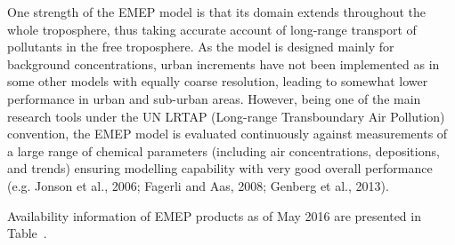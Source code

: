 \documentclass[9pt]{article}
\begin{document}
One strength of the EMEP model is that its domain extends throughout the whole troposphere, thus taking accurate account of long-range transport of pollutants in the free troposphere. 
As the model is designed mainly for background concentrations, urban increments have not been implemented as in some other models with equally coarse resolution, leading to somewhat lower performance in urban and sub-urban areas. 
However, being one of the main research tools under the UN LRTAP (Long-range Transboundary Air Pollution) convention, the EMEP model is evaluated continuously against measurements of a large range of chemical parameters (including air concentrations, depositions, and trends) ensuring modelling capability with very good overall performance (e.g. Jonson et al., 2006; Fagerli and Aas, 2008; Genberg et al., 2013).%

Availability information of EMEP products as of May 2016 are presented in Table~.%

\begin{table}[h!]%
\begin{mdcenter}%
{}%
\end{mdcenter}\label{emep-portfolio}%
\end{table}%
\end{document}
